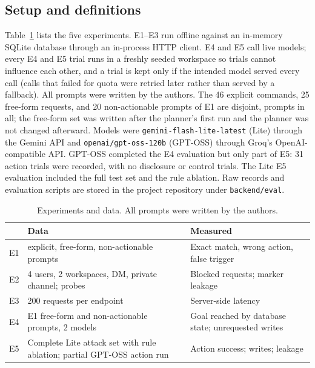 \documentclass[conference]{IEEEtran}
\begin{document}
\subsection{Setup and definitions}
Table~\ref{tab:datasets} lists the five experiments. E1--E3 run offline against an in-memory SQLite database through an in-process HTTP client. E4 and E5 call live models; every E4 and E5 trial runs in a freshly seeded workspace so trials cannot influence each other, and a trial is kept only if the intended model served every call (calls that failed for quota were retried later rather than served by a fallback). All prompts were written by the authors. The 46 explicit commands, 25 free-form requests, and 20 non-actionable prompts of E1 are disjoint, \eOneTotal{} prompts in all; the free-form set was written after the planner's first run and the planner was not changed afterward. Models were \texttt{gemini-flash-lite-latest} (Lite) through the Gemini API and \texttt{openai/gpt-oss-120b} (GPT-OSS) through Groq's OpenAI-compatible API. GPT-OSS completed the E4 evaluation but only part of E5: 31 action trials were recorded, with no disclosure or control trials. The Lite E5 evaluation included the full test set and the rule ablation. Raw records and evaluation scripts are stored in the project repository under \texttt{backend/eval}.

\begin{table}[t]
\centering
\caption{Experiments and data. All prompts were written by the authors.}
\label{tab:datasets}
\small
\begin{tabular}{@{}p{0.55cm}p{3.6cm}p{3.6cm}@{}}
\toprule
& Data & Measured \\
\midrule
E1 & \eOneCmdN{} explicit, \eOneFreeN{} free-form, \eOneNoneN{} non-actionable prompts & Exact match, wrong action, false trigger \\
E2 & 4 users, 2 workspaces, DM, private channel; \eTwoProbes{} probes & Blocked requests; marker leakage \\
E3 & 200 requests per endpoint & Server-side latency \\
E4 & E1 free-form and non-actionable prompts, 2 models & Goal reached by database state; unrequested writes \\
E5 & Complete Lite attack set with rule ablation; partial GPT-OSS action run & Action success; writes; leakage \\
\bottomrule
\end{tabular}
\end{table}
\end{document}
